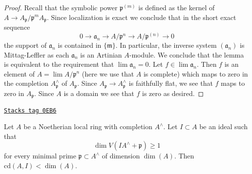 \begin{proof}
Recall that the symbolic power $\mathfrak p^{(m)}$ is defined as the
kernel of $A \to A_\mathfrak p/\mathfrak p^mA_\mathfrak p$.
Since localization is exact we conclude that in the short exact sequence
$$
0 \to \mathfrak a_n \to A/\mathfrak p^n \to A/\mathfrak p^{(n)} \to 0
$$
the support of $\mathfrak a_n$ is contained in $\{\mathfrak m\}$.
In particular, the inverse system $(\mathfrak a_n)$ is Mittag-Leffler
as each $\mathfrak a_n$ is an Artinian $A$-module.
We conclude that the lemma is equivalent to the requirement
that $\lim \mathfrak a_n = 0$. Let $f \in \lim \mathfrak a_n$.
Then $f$ is an element of $A = \lim A/\mathfrak p^n$
(here we use that $A$ is complete)
which maps to zero in the completion $A_\mathfrak p^\wedge$
of $A_\mathfrak p$. Since $A_\mathfrak p \to A_\mathfrak p^\wedge$
is faithfully flat, we see that $f$ maps to zero in $A_\mathfrak p$.
Since $A$ is a domain we see that $f$ is zero as desired.
\end{proof}

\begin{proposition}
\label{local-cohomology-proposition-Hartshorne-Lichtenbaum-vanishing}
\href{https://stacks.math.columbia.edu/tag/0EB6}{\texttt{Stacks tag 0EB6}}

\begin{reference}
\cite[Theorem 3.1]{CD}
\end{reference}
Let $A$ be a Noetherian local ring with completion $A^\wedge$.
Let $I \subset A$ be an ideal such that
$$
\dim V(IA^\wedge + \mathfrak p) \geq 1
$$
for every minimal prime $\mathfrak p \subset A^\wedge$ of dimension $\dim(A)$.
Then $\text{cd}(A, I) < \dim(A)$.
\end{proposition}

